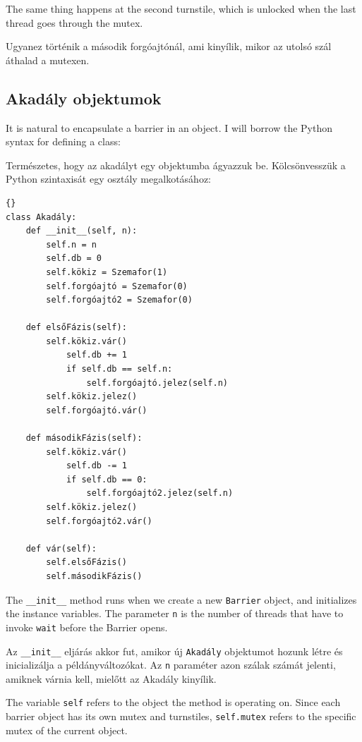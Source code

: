 \documentclass{book}
\begin{document}
The same thing happens at the second turnstile, which is
unlocked when the last thread goes through the mutex.

Ugyanez történik a második forgóajtónál, ami kinyílik, mikor
az utolsó szál áthalad a mutexen.

\newpage
\subsection{Akadály objektumok}

It is natural to encapsulate a barrier in an object.  I will
borrow the Python syntax for defining a class:

Természetes, hogy az akadályt egy objektumba ágyazzuk be.
Kölcsönvesszük a Python szintaxisát egy osztály megalkotásához:

\begin{lstlisting}[title={Akadály objektum}]{}
class Akadály:
    def __init__(self, n):
        self.n = n
        self.db = 0
        self.kökiz = Szemafor(1)
        self.forgóajtó = Szemafor(0)
        self.forgóajtó2 = Szemafor(0)

    def elsőFázis(self):
        self.kökiz.vár()
            self.db += 1
            if self.db == self.n:
                self.forgóajtó.jelez(self.n) 
        self.kökiz.jelez()
        self.forgóajtó.vár()            

    def másodikFázis(self):
        self.kökiz.vár()
            self.db -= 1
            if self.db == 0:
                self.forgóajtó2.jelez(self.n)
        self.kökiz.jelez()
        self.forgóajtó2.vár()

    def vár(self):
        self.elsőFázis()
        self.másodikFázis()
\end{lstlisting}

The {\tt \_\_init\_\_} method runs when we create a new
{\tt Barrier} object, and initializes the instance variables.
The parameter {\tt n} is the number of threads that have
to invoke {\tt wait} before the Barrier opens.

Az {\tt \_\_init\_\_} eljárás akkor fut, amikor új {\tt Akadály} objektumot
hozunk létre és inicializálja a példányváltozókat.
Az {\tt n} paraméter azon szálak számát jelenti, amiknek várnia kell,
mielőtt az Akadály kinyílik.

The variable {\tt self} refers to the object the method
is operating on.  Since each barrier object has its own
mutex and turnstiles, {\tt self.mutex} refers to the specific
mutex of the current object.
\end{document}
